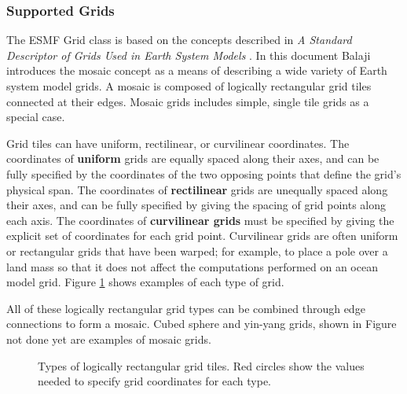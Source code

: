 \subsubsection{Supported Grids}

The ESMF Grid class is based on the concepts described in {\it A Standard Descriptor 
of Grids Used in Earth System Models} \cite{BalajiGridSpec}.  In this document
Balaji introduces the mosaic concept as a means of describing a wide variety of
Earth system model grids.  A mosaic is composed of logically rectangular
grid tiles connected at their edges.  Mosaic grids includes simple,
single tile grids as a special case.

Grid tiles can have uniform, rectilinear, or curvilinear
coordinates.  The coordinates of {\bf uniform} grids are equally spaced along their
axes, and can be fully specified by the coordinates of the two opposing points
that define the grid's physical span.  The coordinates of {\bf rectilinear} grids
are unequally spaced along their axes, and can be fully specified by giving
the spacing of grid points along each axis.  The coordinates of {\bf curvilinear 
grids} must be specified by giving the explicit set of coordinates for each
grid point.  Curvilinear grids are often uniform or rectangular grids that 
have been warped; for example, to place a pole over a land mass so that it
does not affect the computations performed on an ocean model grid.  Figure
\ref{fig:LogRectGrids} shows examples of each type of grid.

All of these logically rectangular grid types can be combined through edge
connections to form a mosaic.  Cubed sphere and yin-yang grids, shown in 
Figure {not done yet} are examples of mosaic grids.
 
\begin{center}
\begin{figure}
\caption{Types of logically rectangular grid tiles.  Red circles show the
values needed to specify grid coordinates for each type.}
\label{fig:LogRectGrids}
\end{figure}
\end{center}

